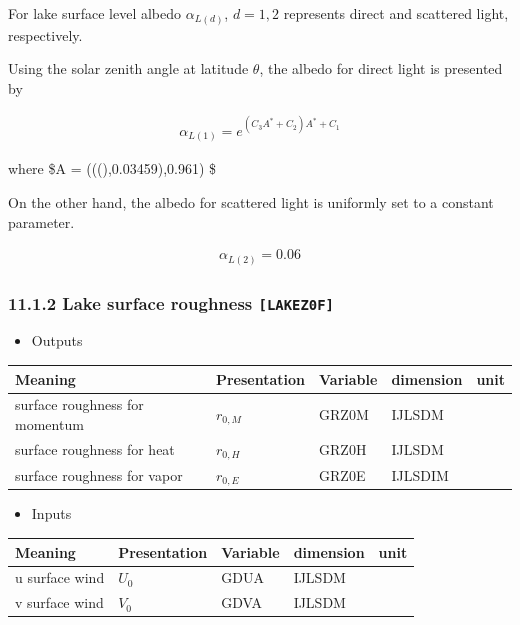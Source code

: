 For lake surface level albedo \(\alpha_{L(d)}\), \(d=1,2\) represents
direct and scattered light, respectively.

Using the solar zenith angle at latitude \(\theta\), the albedo for
direct light is presented by

\begin{eqnarray}
    \alpha_{L(1)} = e^{(C_3A^* + C_2) A^* +C_1}
\end{eqnarray}

where \$A =
(((\theta),0.03459),0.961) \$

On the other hand, the albedo for scattered light is uniformly set to a
constant parameter.

\begin{eqnarray}
    \alpha_{L(2)} = 0.06
\end{eqnarray}

\hypertarget{lake-surface-roughness-lakez0f}{%
\subsubsection{\texorpdfstring{11.1.2 Lake surface roughness
\texttt{{[}LAKEZ0F{]}}}{11.1.2 Lake surface roughness {[}LAKEZ0F{]}}}\label{lake-surface-roughness-lakez0f}}

\begin{itemize}
\tightlist
\item
  Outputs
\end{itemize}

\setlength\LTleft{0pt}\setlength\LTright{0pt}\begin{longtable}[]{@{}lllll@{}}
\toprule\relax
Meaning & Presentation & Variable & dimension & unit\tabularnewline
\midrule\relax
\endhead
surface roughness for momentum & \(r_{0,M}\) & GRZ0M & IJLSDM
&\tabularnewline
surface roughness for heat & \(r_{0,H}\) & GRZ0H & IJLSDM
&\tabularnewline
surface roughness for vapor & \(r_{0,E}\) & GRZ0E & IJLSDIM
&\tabularnewline
\bottomrule
\end{longtable}

\begin{itemize}
\tightlist
\item
  Inputs
\end{itemize}

\setlength\LTleft{0pt}\setlength\LTright{0pt}\begin{longtable}[]{@{}lllll@{}}
\toprule\relax
Meaning & Presentation & Variable & dimension & unit\tabularnewline
\midrule\relax
\endhead
u surface wind & \(U_0\) & GDUA & IJLSDM &\tabularnewline
v surface wind & \(V_0\) & GDVA & IJLSDM &\tabularnewline
\bottomrule
\end{longtable}


